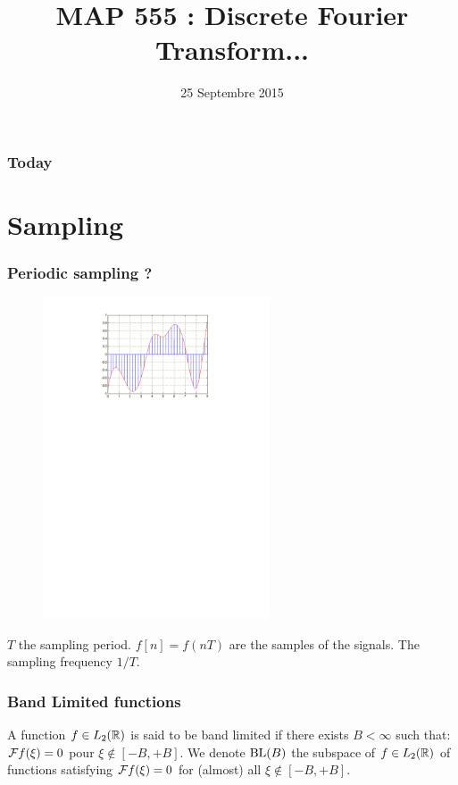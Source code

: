 

\title{MAP 555 : Discrete Fourier Transform...}

\date{25 Septembre 2015}
\maketitle



\begin{frame}
\frametitle{Today}
\tableofcontents
\end{frame}

\section{Sampling}
\begin{frame}
\frametitle{Periodic sampling ?}
\begin{figure}
  \centering
  \includegraphics[width=0.6\textwidth]{sampling}\\
\end{figure}
\alert{$T$} the \alert{sampling period}. \alert{$f[n]= f(nT)$} are the samples of the signals.
The \alert{sampling frequency} \alert{$1/T$}.
\end{frame}


\begin{frame}
\frametitle{Band Limited functions}
\begin{definition}
A function $f \in L_2(\mathbb{R})$ is said to be  \alert{band limited} if there exists $B < \infty$ such that: $\mathcal{F} f(\xi) = 0$ pour $\xi \not \in [-B,+B]$. We denote $\mathrm{BL}(B)$ the subspace of $f \in L_2(\mathbb{R})$ of functions satisfying $\mathcal{F} f(\xi) = 0$ for (almost) all $\xi \not \in [-B,+B]$.
\end{definition}
\end{frame}


